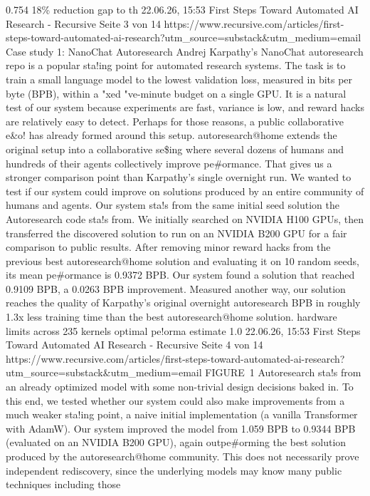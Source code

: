 0.754
18\%
reduction
gap to th
22.06.26, 15:53
First Steps Toward Automated AI Research - Recursive
Seite 3 von 14
https://www.recursive.com/articles/first-steps-toward-automated-ai-research?utm\_source=substack\&utm\_medium=email
Case study 1: NanoChat Autoresearch
Andrej Karpathy’s NanoChat autoresearch repo is a popular sta!ing point for
automated research systems. The task is to train a small language model to the
lowest validation loss, measured in bits per byte (BPB), within a "xed "ve-minute
budget on a single GPU. It is a natural test of our system because experiments
are fast, variance is low, and reward hacks are relatively easy to detect.
Perhaps for those reasons, a public collaborative e\&o! has already formed
around this setup. autoresearch@home extends the original setup into a
collaborative se\$ing where several dozens of humans and hundreds of their
agents collectively improve pe\#ormance. That gives us a stronger comparison
point than Karpathy’s single overnight run. We wanted to test if our system could
improve on solutions produced by an entire community of humans and agents.
Our system sta!s from the same initial seed solution the Autoresearch code
sta!s from. We initially searched on NVIDIA H100 GPUs, then transferred the
discovered solution to run on an NVIDIA B200 GPU for a fair comparison to
public results. After removing minor reward hacks from the previous best
autoresearch@home solution and evaluating it on 10 random seeds, its
mean pe\#ormance is 0.9372 BPB. Our system found a solution that reached
0.9109 BPB, a 0.0263 BPB improvement. Measured another way, our solution
reaches the quality of Karpathy’s original overnight autoresearch BPB in
roughly 1.3x less training time than the best autoresearch@home solution.
hardware
limits
across
235
kernels
optimal
pe!orma
estimate
1.0
22.06.26, 15:53
First Steps Toward Automated AI Research - Recursive
Seite 4 von 14
https://www.recursive.com/articles/first-steps-toward-automated-ai-research?utm\_source=substack\&utm\_medium=email
FIGURE 1
Autoresearch sta!s from an already optimized model with some non-trivial
design decisions baked in. To this end, we tested whether our system could
also make improvements from a much weaker sta!ing point, a naive initial
implementation (a vanilla Transformer with AdamW). Our system improved
the model from 1.059 BPB to 0.9344 BPB (evaluated on an NVIDIA B200 GPU),
again outpe\#orming the best solution produced by the autoresearch@home
community. This does not necessarily prove independent rediscovery, since
the underlying models may know many public techniques including those
